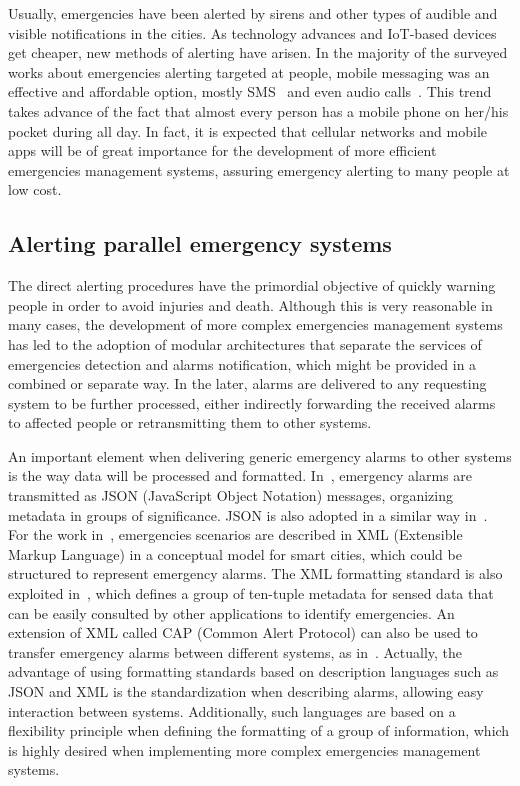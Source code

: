 \begin{refsection}
Usually, emergencies have been alerted by sirens and other types of audible and visible notifications in the cities. As technology advances and IoT-based devices get cheaper, new methods of alerting have arisen. In the majority of the surveyed works about emergencies alerting targeted at people, mobile messaging was an effective and affordable option, mostly SMS~\cite{notification2,notification1,notification4,notification5, notification6} and even audio calls~\cite{notification5}. This trend takes advance of the fact that almost every person has a mobile phone on her/his pocket during all day. In fact, it is expected that cellular networks and mobile apps will be of great importance for the development of more efficient emergencies management systems, assuring emergency alerting to many people at low cost. 

\subsection{Alerting parallel emergency systems}

The direct alerting procedures have the primordial objective of quickly warning people in order to avoid injuries and death. Although this is very reasonable in many cases, the development of more complex emergencies management systems has led to the adoption of modular architectures that separate the services of emergencies detection and alarms notification, which might be provided in a combined or separate way. In the later, alarms are delivered to any requesting system to be further processed, either indirectly forwarding the received alarms to affected people or retransmitting them to other systems.

An important element when delivering generic emergency alarms to other systems is the way data will be processed and formatted. In~\cite{emergenciesmetric2,emergenciesmetric3}, emergency alarms are transmitted as JSON (JavaScript Object Notation) messages, organizing metadata in groups of significance. JSON is also adopted in a similar way in~\cite{emergenciesmetric5}. For the work in~\cite{emergenciesxml}, emergencies scenarios are described in XML (Extensible Markup Language) in a conceptual model for smart cities, which could be structured to represent emergency alarms. The XML formatting standard is also exploited in~\cite{emergenciesxml2}, which defines a group of ten-tuple metadata for sensed data that can be easily consulted by other applications to identify emergencies. An extension of XML called CAP (Common Alert Protocol) can also be used to transfer emergency alarms between different systems, as in~\cite{notification1}. Actually, the advantage of using formatting standards based on description languages such as JSON and XML is the standardization when describing alarms, allowing easy interaction between systems. Additionally, such languages are based on a flexibility principle when defining the formatting of a group of information, which is highly desired when implementing more complex emergencies management systems.


\end{refsection}
